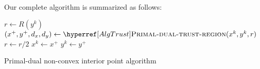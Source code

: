 \documentclass{article}
\begin{document}
Our complete algorithm is summarized as follows:

\begin{algorithm}[H]
\begin{algorithmic}\label{AlgMain}
\State $r \gets R (y^k)$
\Repeat
\State $(x^{+}, y^{+}, d_{x}, d_{y}) \gets \callAlgTrust{x^k, y^k, r}$
\State {}
\EndIf
\EndIf
\State $r \gets r / 2$
\State $x^{k} \gets x^{+}$
\State $y^k \gets y^{+}$
\EndFor
\EndFunction
\end{algorithmic}
\caption{Primal-dual non-convex interior point algorithm}
\end{algorithm}
\end{document}
